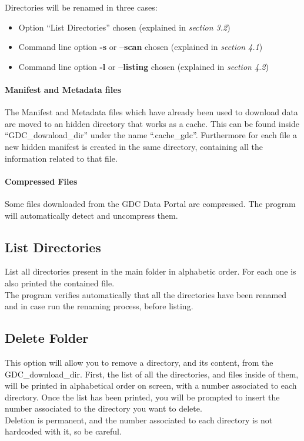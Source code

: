 \documentclass[hidelinks,12pt]{article}
\begin{document}
Directories will be renamed in three cases:
\begin{itemize}
\item Option ``List Directories'' chosen (explained in \textit{section 3.2})
\item Command line option \textbf{-s} or \textbf{--scan} chosen (explained in \textit{section 4.1})
\item Command line option \textbf{-l} or \textbf{--listing} chosen (explained in \textit{section 4.2})
\end{itemize}

\paragraph{Manifest and Metadata files}
The Manifest and Metadata files which have already been used to download data are moved to an hidden directory that works as a cache. This can be found inside ``GDC\_download\_dir'' under the name ``.cache\_gdc''.
Furthermore for each file a new hidden manifest is created in the same directory, containing all the information related to that file. 

\paragraph{Compressed Files}
Some files downloaded from the GDC Data Portal are compressed. The program will automatically detect and uncompress them.



\subsection{List Directories}
List all directories present in the main folder in alphabetic order. For each one is also printed the contained file.\\
The program verifies automatically that all the directories have been renamed and in case run the renaming process, before listing.


\subsection{Delete Folder}

This option will allow you to remove a directory, and its content, from the GDC\_download\_dir.
First, the list of all the directories, and files inside of them, will be printed in alphabetical order on screen, with a number associated to each directory. Once the list has been printed, you will be prompted to insert the number associated to the directory you want to delete.\\
Deletion is permanent, and the number associated to each directory is not hardcoded with it, so be careful.
\end{document}
